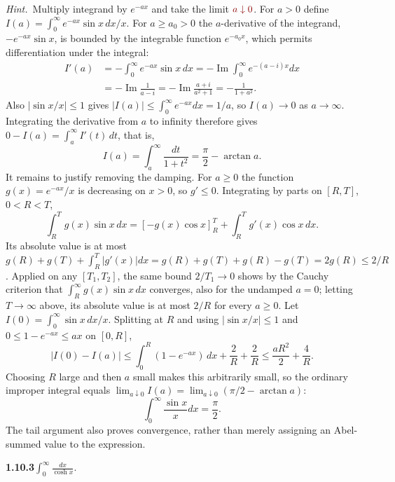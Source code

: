 \emph{Hint.}~Multiply integrand by $e^{-ax}$ and take the limit $\erratum{a\downarrow0}$.
\solution
{}
For $a>0$ define $I(a)=\int_0^\infty e^{-ax}\sin x\,dx/x$.
For $a\ge a_0>0$ the $a$-derivative of the integrand,
$-e^{-ax}\sin x$, is bounded by the integrable function $e^{-a_0x}$,
which permits differentiation under the integral:
\[
 \begin{aligned}
 I'(a)&=-\int_0^\infty e^{-ax}\sin x\,dx
       =-\operatorname{Im}\int_0^\infty e^{-(a-i)x}dx\\
      &=-\operatorname{Im}\frac1{a-i}
       =-\operatorname{Im}\frac{a+i}{a^2+1}=-\frac1{1+a^2}.
 \end{aligned}
\]
Also $|\sin x/x|\le1$ gives $|I(a)|\le\int_0^\infty e^{-ax}dx=1/a$,
so $I(a)\to0$ as $a\to\infty$. Integrating the derivative from $a$ to
infinity therefore gives $0-I(a)=\int_a^\infty I'(t)\,dt$, that is,
\[
 I(a)=\int_a^\infty\frac{dt}{1+t^2}=\frac\pi2-\arctan a.
\]
It remains to justify removing the damping. For $a\ge0$ the function
$g(x)=e^{-ax}/x$ is decreasing on $x>0$, so $g'\le0$. Integrating by
parts on $[R,T]$, $0<R<T$,
\[
 \int_R^T g(x)\sin x\,dx=[-g(x)\cos x]_R^T+
                              \int_R^T g'(x)\cos x\,dx.
\]
Its absolute value is at most
$g(R)+g(T)+\int_R^T|g'(x)|dx
=g(R)+g(T)+g(R)-g(T)=2g(R)\le2/R$.
Applied on any $[T_1,T_2]$, the same bound $2/T_1\to0$ shows by the
Cauchy criterion that $\int_R^\infty g(x)\sin x\,dx$ converges, also
for the undamped $a=0$; letting $T\to\infty$ above, its absolute value
is at most $2/R$ for every $a\ge0$. Let
$I(0)=\int_0^\infty\sin x\,dx/x$. Splitting at $R$ and using
$|\sin x/x|\le1$ and $0\le1-e^{-ax}\le ax$ on $[0,R]$,
\[
 |I(0)-I(a)|\le\int_0^R(1-e^{-ax})\,dx+\frac2R+\frac2R
 \le\frac{aR^2}2+\frac4R.
\]
Choosing $R$ large and then $a$ small makes this arbitrarily small, so
the ordinary improper integral equals
$\lim_{a\downarrow0}I(a)=\lim_{a\downarrow0}(\pi/2-\arctan a)$:
\[
 \boxed{\int_0^\infty\frac{\sin x}{x}dx=\frac\pi2}.
\]
The tail argument also proves convergence, rather than merely assigning
an Abel-summed value to the expression.


\par\bigskip
\noindent\textbf{1.10.3}\quad $\displaystyle\int_{0}^{\infty}\frac{dx}{\cosh x}$.

